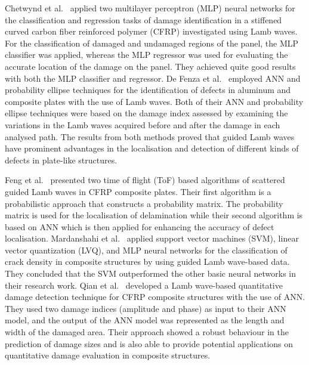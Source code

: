 Chetwynd et al.~\cite{chetwynd2008damage} applied two multilayer perceptron (MLP) neural networks for the classification and regression tasks of
damage identification in a stiffened curved carbon fiber reinforced polymer (CFRP) investigated using Lamb waves.
For the classification of damaged and undamaged regions of the panel, the MLP classifier was applied, whereas the MLP regressor was used for evaluating the accurate location of the damage on the panel. 
They achieved quite good results with both the MLP classifier and regressor.
De Fenza et al.~\cite{de2015application} employed ANN and probability ellipse techniques for the identification of defects in aluminum and composite plates with the use of Lamb waves.
Both of their ANN and probability ellipse techniques were based on the damage index assessed by examining the variations in the Lamb waves acquired before and after the damage in each analysed path.
The results from both methods proved that guided Lamb waves have prominent advantages in the localisation and detection of different kinds of defects in plate-like structures. 

Feng et al.~\cite{feng2019locating} presented two time of flight (ToF) based algorithms of scattered guided Lamb waves in CFRP composite plates.
Their first algorithm is a probabilistic approach that constructs a probability
matrix. 
The probability matrix is used for the localisation of delamination while
their second algorithm is based on ANN which is then applied for enhancing
the accuracy of defect localisation.
Mardanshahi et al.~\cite{mardanshahi2020detection} applied support vector machines (SVM), linear vector quantization (LVQ), and MLP neural networks for the classification of crack density in composite structures by using guided Lamb wave-based data.
They concluded that the SVM outperformed the other basic neural networks in
their research work.
Qian et al.~\cite{qian2020application} developed a Lamb wave-based quantitative damage detection technique for CFRP composite structures with the use of ANN.  
They used two damage indices (amplitude and phase) as input to their ANN model, and the output of the ANN model was represented as the length and width of the damaged area.  
Their approach showed a robust behaviour in the prediction of damage sizes and is also able to provide potential applications on quantitative damage evaluation in composite structures.  

